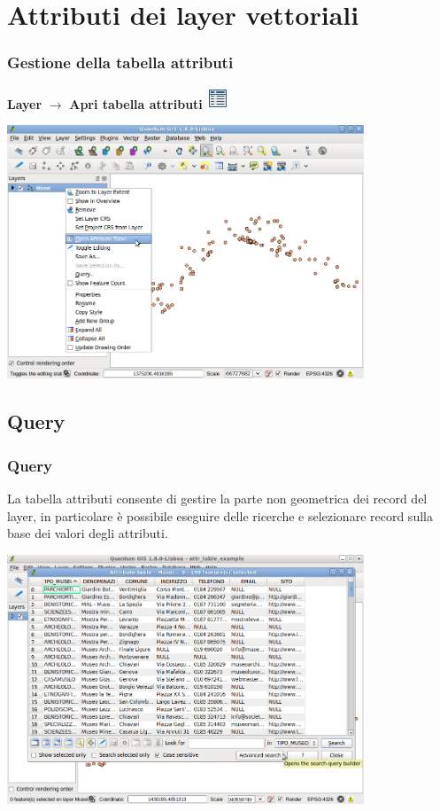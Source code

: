 \documentclass{beamer}
\begin{document}
{\section{Attributi dei layer vettoriali}

 \begin{frame}
  \frametitle{Gestione della tabella attributi}
	 \textbf{Layer} $\rightarrow$ \textbf{Apri tabella attributi}		
		\includegraphics[height=0.4 cm] {digitizing_pics/attr.png}

		    \begin{center}
			\includegraphics[width=0.80\textwidth] {topology_attrmanagement_pics/open_attr_table.png}
		    \end{center}
\end{frame}


\subsection{Query}

\begin{frame}
   \frametitle{Query}
   La tabella attributi consente di gestire la parte non geometrica dei record del layer, in particolare è possibile eseguire delle ricerche e selezionare record sulla base dei valori degli attributi.
		    \begin{center}
			\includegraphics[width=0.80\textwidth] {topology_attrmanagement_pics/attr_table.png}
		    \end{center}
\end{frame}


}
\end{document}
